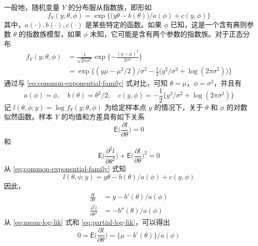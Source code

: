 \documentclass[12pt,a4paper,UTF8,twoside]{book}
\theoremstyle{definition}
\theoremstyle{definition}
\theoremstyle{definition}
\theoremstyle{remark}
\begin{document}
一般地，随机变量 \(Y\) 的分布服从指数族，即形如
\begin{equation}
f_{Y}(y;\theta,\phi) = \exp\big\{ \big(y\theta - b(\theta) \big)/a(\phi) + c(y,\phi) \big\}
\label{eq:common-exponential-family}
\end{equation}
\noindent 其中，\(a(\cdot),b(\cdot),c(\cdot)\) 是某些特定的函数。如果 \(\phi\) 已知，这是一个含有典则参数 \(\theta\) 的指数族模型，如果 \(\phi\) 未知，它可能是含有两个参数的指数族。对于正态分布
\begin{equation}
\begin{aligned}
f_{Y}(y;\theta,\phi) & = \frac{1}{\sqrt{2\pi\sigma^2}} \exp\{-\frac{(y - \mu)^2}{2\sigma^2}  \}  \\
 & = \exp\big \{ (y\mu - \mu^2/2)/\sigma^2 - \frac{1}{2}\big(y^2/\sigma^2 + \log(2\pi\sigma^2)\big) \big\}
\end{aligned} \label{eq:normal-distribution}
\end{equation}
\noindent 通过与 \eqref{eq:common-exponential-family} 式对比，可知 \(\theta = \mu\)，\(\phi = \sigma^2\)，并且有
\[
a(\phi) = \phi, \quad b(\theta) = \theta^2/2, \quad c(y,\phi) = - \frac{1}{2}\{ y^2/\sigma^2 + \log(2\pi\sigma^2) \} 
\]
\noindent 记 \(l(\theta,\phi;y) = \log f_{Y}(y;\theta,\phi)\) 为给定样本点 \(y\) 的情况下，关于 \(\theta\) 和 \(\phi\) 的对数似然函数。样本 \(Y\) 的均值和方差具有如下关系 \citep{McCullagh1989}
\begin{equation}
\mathsf{E}\big( \frac{\partial l}{\partial \theta} \big) = 0
\label{eq:mean-log-lik}
\end{equation}
\noindent 和
\begin{equation}
\mathsf{E}\big( \frac{\partial^2 l}{\partial \theta^2} \big) + \mathsf{E}\big(\frac{\partial l}{\partial \theta}\big)^2  = 0
\label{eq:variance-log-lik}
\end{equation}
\noindent 从 \eqref{eq:common-exponential-family} 式知
\[ l(\theta,\phi;y) = {y\theta - b(\theta)}/a(\phi) + c(y,\phi) \]
\noindent 因此，
\begin{equation}
\begin{aligned}
\frac{\partial l}{\partial \theta} & = {y - b'(\theta)}/a(\phi)  \\
\frac{\partial^2 l}{\partial \theta^2}  & = - b''(\theta)/a(\phi)
\end{aligned} \label{eq:partial-log-lik}
\end{equation}
\noindent 从 \eqref{eq:mean-log-lik} 式和 \eqref{eq:partial-log-lik}，可以得出
\[ 
0 = \mathsf{E}\big( \frac{\partial l}{\partial \theta} \big) = \big\{ \mu - b'(\theta) \big\}/a(\phi)
\]
\end{document}

